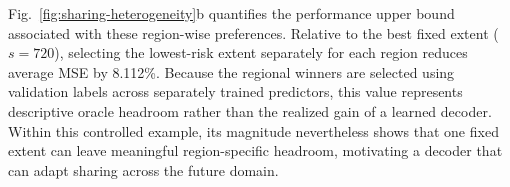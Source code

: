 Fig.~\ref{fig:sharing-heterogeneity}b quantifies the performance upper bound associated with these region-wise preferences. Relative to the best fixed extent ($s=720$), selecting the lowest-risk extent separately for each region reduces average MSE by 8.112\%. Because the regional winners are selected using validation labels across separately trained predictors, this value represents descriptive oracle headroom rather than the realized gain of a learned decoder. Within this controlled example, its magnitude nevertheless shows that one fixed extent can leave meaningful region-specific headroom, motivating a decoder that can adapt sharing across the future domain.
